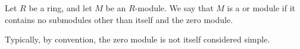 \documentclass[12pt]{article}
\begin{document}
Let $R$ be a ring, and let $M$ be an $R$-module.
We say that $M$ is a {} 
or {} {\PMlinkescapetext module }
if it contains no submodules 
other than itself and the zero module.

Typically, by convention, the zero module is not itself considered simple.
\end{document}
